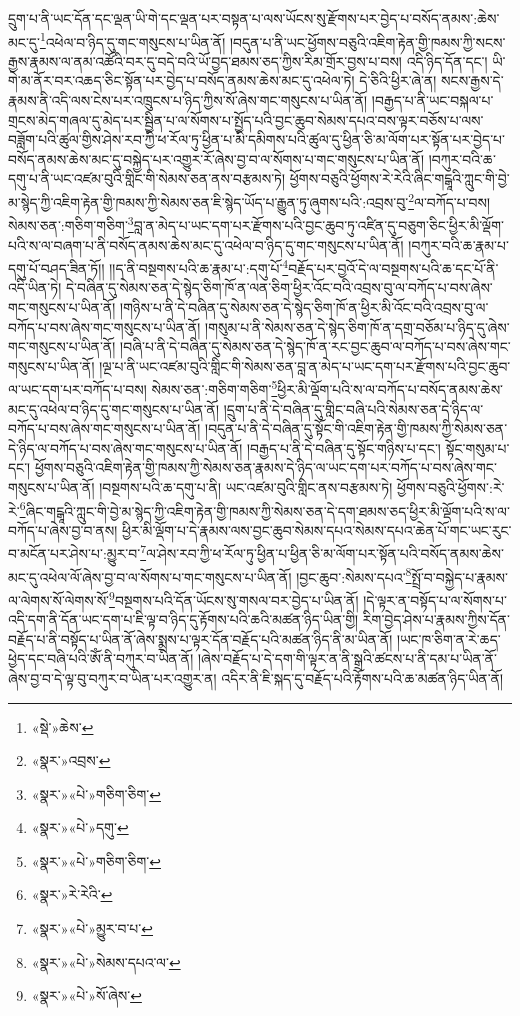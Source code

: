 དྲུག་པ་ནི་ཡང་དོན་དང་ལྡན་ཡི་གེ་དང་ལྡན་པར་བསྟན་པ་ལས་ཡོངས་སུ་རྫོགས་པར་བྱེད་པ་བསོད་ནམས་:ཆེས་མང་དུ་\footnote{«སྡེ་»ཆེས་}འཕེལ་བ་ཉིད་དུ་གང་གསུངས་པ་ཡིན་ནོ། །བདུན་པ་ནི་ཡང་ཕྱོགས་བཅུའི་འཇིག་རྟེན་གྱི་ཁམས་ཀྱི་སངས་རྒྱས་རྣམས་ལ་ནམ་འཚོའི་བར་དུ་བདེ་བའི་ཡོ་བྱད་ཐམས་ཅད་ཀྱིས་རིམ་གྲོར་བྱས་པ་བས། འདི་ཉིད་དོན་དང་། ཡི་གེ་མ་ནོར་བར་འཆད་ཅིང་སྟོན་པར་བྱེད་པ་བསོད་ནམས་ཆེས་མང་དུ་འཕེལ་ཏེ། དེ་ཅིའི་ཕྱིར་ཞེ་ན། སངས་རྒྱས་དེ་རྣམས་ནི་འདི་ལས་ངེས་པར་འཁྲུངས་པ་ཉིད་ཀྱིས་སོ་ཞེས་གང་གསུངས་པ་ཡིན་ནོ། །བརྒྱད་པ་ནི་ཡང་བསྐལ་པ་གྲངས་མེད་གཞལ་དུ་མེད་པར་སྦྱིན་པ་ལ་སོགས་པ་སྤྱོད་པའི་བྱང་ཆུབ་སེམས་དཔའ་བས་ལྟར་བཅོས་པ་ལས་བཟློག་པའི་ཚུལ་གྱིས་ཤེས་རབ་ཀྱི་ཕ་རོལ་ཏུ་ཕྱིན་པ་མི་དམིགས་པའི་ཚུལ་དུ་ཕྱིན་ཅི་མ་ལོག་པར་སྟོན་པར་བྱེད་པ་བསོད་ནམས་ཆེས་མང་དུ་བསྐྱེད་པར་འགྱུར་རོ་ཞེས་བྱ་བ་ལ་སོགས་པ་གང་གསུངས་པ་ཡིན་ནོ། །བཀུར་བའི་ཆ་དགུ་པ་ནི་ཡང་འཛམ་བུའི་གླིང་གི་སེམས་ཅན་ནས་བརྩམས་ཏེ། ཕྱོགས་བཅུའི་ཕྱོགས་རེ་རེའི་ཞིང་གངྒཱའི་ཀླུང་གི་བྱེ་མ་སྙེད་ཀྱི་འཇིག་རྟེན་གྱི་ཁམས་ཀྱི་སེམས་ཅན་ཇི་སྙེད་ཡོད་པ་རྒྱུན་ཏུ་ཞུགས་པའི་:འབྲས་བུ་\footnote{«སྣར་»འབྲས་}ལ་བཀོད་པ་བས། སེམས་ཅན་:གཅིག་གཅིག་\footnote{«སྣར་»«པེ་»གཅིག་ཅིག་}བླ་ན་མེད་པ་ཡང་དག་པར་རྫོགས་པའི་བྱང་ཆུབ་ཏུ་འཛིན་དུ་བཅུག་ཅིང་ཕྱིར་མི་ལྡོག་པའི་ས་ལ་བཞག་པ་ནི་བསོད་ནམས་ཆེས་མང་དུ་འཕེལ་བ་ཉིད་དུ་གང་གསུངས་པ་ཡིན་ནོ། །བཀུར་བའི་ཆ་རྣམ་པ་དགུ་པོ་བཤད་ཟིན་ཏོ།། །།ད་ནི་བསྔགས་པའི་ཆ་རྣམ་པ་:དགུ་པོ་\footnote{«སྣར་»«པེ་»དགུ་}བརྗོད་པར་བྱའོ་དེ་ལ་བསྔགས་པའི་ཆ་དང་པོ་ནི་འདི་ཡིན་ཏེ། དེ་བཞིན་དུ་སེམས་ཅན་དེ་སྙེད་ཅིག་ཁོ་ན་ལན་ཅིག་ཕྱིར་འོང་བའི་འབྲས་བུ་ལ་བཀོད་པ་བས་ཞེས་གང་གསུངས་པ་ཡིན་ནོ། །གཉིས་པ་ནི་དེ་བཞིན་དུ་སེམས་ཅན་དེ་སྙེད་ཅིག་ཁོ་ན་ཕྱིར་མི་འོང་བའི་འབྲས་བུ་ལ་བཀོད་པ་བས་ཞེས་གང་གསུངས་པ་ཡིན་ནོ། །གསུམ་པ་ནི་སེམས་ཅན་དེ་སྙེད་ཅིག་ཁོ་ན་དགྲ་བཅོམ་པ་ཉིད་དུ་ཞེས་གང་གསུངས་པ་ཡིན་ནོ། །བཞི་པ་ནི་དེ་བཞིན་དུ་སེམས་ཅན་དེ་སྙེད་ཁོ་ན་རང་བྱང་ཆུབ་ལ་བཀོད་པ་བས་ཞེས་གང་གསུངས་པ་ཡིན་ནོ། །ལྔ་པ་ནི་ཡང་འཛམ་བུའི་གླིང་གི་སེམས་ཅན་བླ་ན་མེད་པ་ཡང་དག་པར་རྫོགས་པའི་བྱང་ཆུབ་ལ་ཡང་དག་པར་བཀོད་པ་བས། སེམས་ཅན་:གཅིག་གཅིག་\footnote{«སྣར་»«པེ་»གཅིག་ཅིག་}ཕྱིར་མི་ལྡོག་པའི་ས་ལ་བཀོད་པ་བསོད་ནམས་ཆེས་མང་དུ་འཕེལ་བ་ཉིད་དུ་གང་གསུངས་པ་ཡིན་ནོ། །དྲུག་པ་ནི་དེ་བཞིན་དུ་གླིང་བཞི་པའི་སེམས་ཅན་དེ་ཉིད་ལ་བཀོད་པ་བས་ཞེས་གང་གསུངས་པ་ཡིན་ནོ། །བདུན་པ་ནི་དེ་བཞིན་དུ་སྟོང་གི་འཇིག་རྟེན་གྱི་ཁམས་ཀྱི་སེམས་ཅན་དེ་ཉིད་ལ་བཀོད་པ་བས་ཞེས་གང་གསུངས་པ་ཡིན་ནོ། །བརྒྱད་པ་ནི་དེ་བཞིན་དུ་སྟོང་གཉིས་པ་དང་། སྟོང་གསུམ་པ་དང་། ཕྱོགས་བཅུའི་འཇིག་རྟེན་གྱི་ཁམས་ཀྱི་སེམས་ཅན་རྣམས་དེ་ཉིད་ལ་ཡང་དག་པར་བཀོད་པ་བས་ཞེས་གང་གསུངས་པ་ཡིན་ནོ། །བསྔགས་པའི་ཆ་དགུ་པ་ནི། ཡང་འཛམ་བུའི་གླིང་ནས་བརྩམས་ཏེ། ཕྱོགས་བཅུའི་ཕྱོགས་:རེ་རེ་\footnote{«སྣར་»རེ་རེའི་}ཞིང་གངྒཱའི་ཀླུང་གི་བྱེ་མ་སྙེད་ཀྱི་འཇིག་རྟེན་གྱི་ཁམས་ཀྱི་སེམས་ཅན་དེ་དག་ཐམས་ཅད་ཕྱིར་མི་ལྡོག་པའི་ས་ལ་བཀོད་པ་ཞེས་བྱ་བ་ནས། ཕྱིར་མི་ལྡོག་པ་དེ་རྣམས་ལས་བྱང་ཆུབ་སེམས་དཔའ་སེམས་དཔའ་ཆེན་པོ་གང་ཡང་རུང་བ་མངོན་པར་ཤེས་པ་:མྱུར་བ་\footnote{«སྣར་»«པེ་»མྱུར་བ་པ་}ལ་ཤེས་རབ་ཀྱི་ཕ་རོལ་ཏུ་ཕྱིན་པ་ཕྱིན་ཅི་མ་ལོག་པར་སྟོན་པའི་བསོད་ནམས་ཆེས་མང་དུ་འཕེལ་ལོ་ཞེས་བྱ་བ་ལ་སོགས་པ་གང་གསུངས་པ་ཡིན་ནོ། །བྱང་ཆུབ་:སེམས་དཔའ་\footnote{«སྣར་»«པེ་»སེམས་དཔའ་ལ་}སྤྲོ་བ་བསྐྱེད་པ་རྣམས་ལ་ལེགས་སོ་ལེགས་སོ་\footnote{«སྣར་»«པེ་»སོ་ཞེས་}བསྔགས་པའི་དོན་ཡོངས་སུ་གསལ་བར་བྱེད་པ་ཡིན་ནོ། །དེ་ལྟར་ན་བསྟོད་པ་ལ་སོགས་པ་འདི་དག་ནི་དོན་ཡང་དག་པ་ཇི་ལྟ་བ་ཉིད་དུ་རྟོགས་པའི་ཆའི་མཚན་ཉིད་ཡིན་གྱི། རིག་བྱེད་ཤེས་པ་རྣམས་ཀྱིས་དོན་བརྗོད་པ་ནི་བསྟོད་པ་ཡིན་ནོ་ཞེས་སྨྲས་པ་ལྟར་དོན་བརྗོད་པའི་མཚན་ཉིད་ནི་མ་ཡིན་ནོ། །ཡང་ཁ་ཅིག་ན་རེ་ཆད་ཕྱེད་དང་བཞི་པའི་ཨོཾ་ནི་བཀུར་བ་ཡིན་ནོ། །ཞེས་བརྗོད་པ་དེ་དག་གི་ལྟར་ན་ནི་སྒྲའི་ཚངས་པ་ནི་དམ་པ་ཡིན་ནོ་ཞེས་བྱ་བ་དེ་ལྟ་བུ་བཀུར་བ་ཡིན་པར་འགྱུར་ན། འདིར་ནི་ཇི་སྐད་དུ་བརྗོད་པའི་རྟོགས་པའི་ཆ་མཚན་ཉིད་ཡིན་ནོ། 